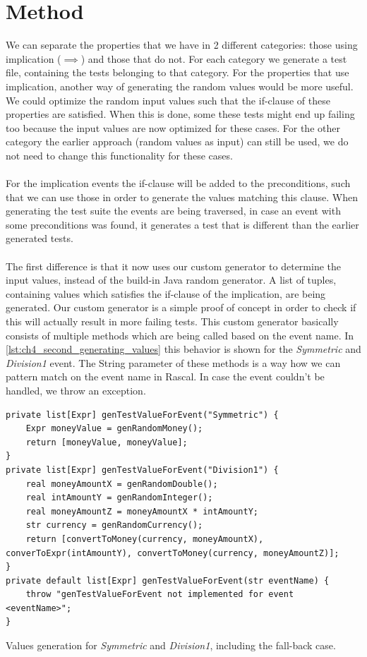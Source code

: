 \section{Method}
We can separate the properties that we have in 2 different categories: those using implication ($\implies$) and those that do not. For each category we generate a test file, containing the tests belonging to that category. For the properties that use implication, another way of generating the random values would be more useful. We could optimize the random input values such that the if-clause of these properties are satisfied. When this is done, some these tests might end up failing too because the input values are now optimized for these cases. For the other category the earlier approach (random values as input) can still be used, we do not need to change this functionality for these cases.\\
\\
For the implication events the if-clause will be added to the preconditions, such that we can use those in order to generate the values matching this clause. When generating the test suite the events are being traversed, in case an event with some preconditions was found, it generates a test that is different than the earlier generated tests.\\
\\
The first difference is that it now uses our custom generator to determine the input values, instead of the build-in Java random generator. A list of tuples, containing values which satisfies the if-clause of the implication, are being generated. Our custom generator is a simple proof of concept in order to check if this will actually result in more failing tests. This custom generator basically consists of multiple methods which are being called based on the event name. In \autoref{lst:ch4_second_generating_values} this behavior is shown for the \textit{Symmetric} and \textit{Division1} event. The String parameter of these methods is a way how we can pattern match on the event name in Rascal. In case the event couldn't be handled, we throw an exception.
\\
\begin{sourcecode}[h!]
\begin{lstlisting}[language=Rascal]
private list[Expr] genTestValueForEvent("Symmetric") {
    Expr moneyValue = genRandomMoney();
    return [moneyValue, moneyValue];
}
private list[Expr] genTestValueForEvent("Division1") {
    real moneyAmountX = genRandomDouble();
    real intAmountY = genRandomInteger();
    real moneyAmountZ = moneyAmountX * intAmountY;
    str currency = genRandomCurrency();
    return [convertToMoney(currency, moneyAmountX), converToExpr(intAmountY), convertToMoney(currency, moneyAmountZ)];
}
private default list[Expr] genTestValueForEvent(str eventName) {
    throw "genTestValueForEvent not implemented for event <eventName>";
}
\end{lstlisting}
\caption{Values generation for \textit{Symmetric} and \textit{Division1}, including the fall-back case.}
\label{lst:ch4_second_generating_values}
\end{sourcecode}
